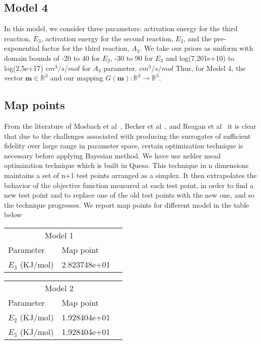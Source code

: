 \subsection{Model 4}


 In this model, we consider three parameters: activation energy for
 the third reaction, $E_3$,
 activation energy for the second reaction, $E_2$, and the pre-exponential
 factor for the third reaction, $A_3$. We take our priors as uniform
 with domain bounds of -20 to 40 for $E_2$, -30 to 90 for $E_3$ and
 log(7.201e+10) to log(2.5e+17) $cm^3/s/mol$ for $A_3$ parameter. $cm^3/s/mol$
Thus, for Model 4, the vector
 $\mathbf{m} \in \mathbb{R}^3$ and our mapping $G(\mathbf{m}):
\mathbb{R}^3 \rightarrow \mathbb{R}^5$.


\subsection{Map points}

From the literature of Mosbach et al~\cite{mosbac}, Becker et al~\cite{Braack}, and Reagan et al~\cite{Reagan} it is clear that  due to the challenges associated with producing the surrogates of sufficient fidelity over large range in parameter space, certain optimization technique is necessary before applying Bayesian method. We have use nelder mead optimization technique  which is built in Queso. This technique in n dimensions maintains a set of n+1 test points arranged as a simplex. It then extrapolates the behavior of the objective function measured at each test point, in order to find a new test point and to replace one of the old test points with the new one, and so the technique progresses. We report map points for different model in the table below

 \begin{tabular}{llr}  
    \toprule
    \multicolumn{2}{c}{Model 1} \\
    \cmidrule(r){1-2}
    Parameter   & Map point \\
    \midrule
    $E_3$ (KJ/mol)     &  2.823748e+01  \\
    \bottomrule
  \end{tabular}
  
  
   \begin{tabular}{llr}  
    \toprule
    \multicolumn{2}{c}{Model 2} \\
    \cmidrule(r){1-2}
    Parameter   & Map point \\
    \midrule
    $E_2$ (KJ/mol)     &  1.928404e+01  \\
    $E_3$ (KJ/mol)     &  1.928404e+01  \\
    \bottomrule
  \end{tabular}
  
